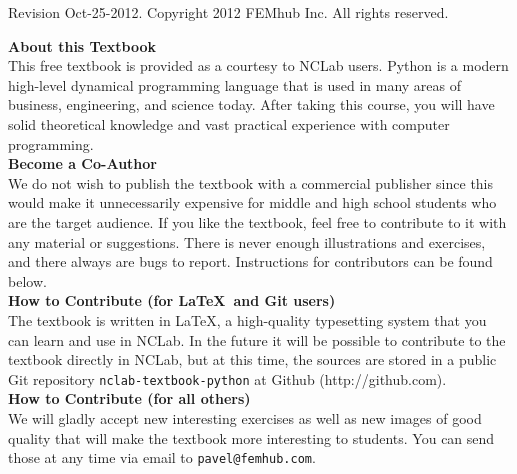 \documentclass[article,A4,12pt]{llncs}
\newif\iffullversion
\begin{document}
\begin{center}
\end{center}
\vbox{}
\vspace{5mm}
\begin{center}
\iffullversion
\else
\centerline{\huge \color{red}{PREVIEW}}
\fi
\vfill
\end{center}
\vfill
\vfill
\begin{center}
Revision Oct-25-2012. Copyright 2012 FEMhub Inc. All rights reserved.
\end{center}
\newpage
\vbox{}
\vfill
{
\noindent
{\bf About this Textbook}\\[4mm]
This free textbook is provided as a courtesy to NCLab users. 
Python is a modern high-level 
dynamical programming language that is used in many areas of business, 
engineering, and science today. After taking this course, you will 
have solid theoretical knowledge and vast practical experience with 
computer programming. \\[4mm]

\noindent
{\bf Become a Co-Author}\\[4mm]
We do not wish to publish the textbook with a commercial publisher since this 
would make it unnecessarily expensive for middle and high school students who
are the target audience. If you like the textbook, feel free to contribute 
to it with any material or suggestions. There is never enough illustrations and exercises, 
and there always are bugs to report. Instructions for contributors can be found 
below.\\[4mm]

\noindent
{\bf How to Contribute (for \LaTeX \ and Git users)}\\[4mm]
\noindent
The textbook is written in \LaTeX, a high-quality typesetting system that 
you can learn and use in NCLab. In the future it will be possible to contribute to 
the textbook directly in NCLab, but at this time, the sources are stored 
in a public Git repository {\tt nclab-textbook-python} at Github (http://github.com). \\[4mm]

\noindent
{\bf How to Contribute (for all others)}\\[4mm]
\noindent
We will gladly accept new interesting exercises as well as
new images of good quality that will make the textbook more interesting to students. You
can send those at any time via email to {\tt pavel@femhub.com}.\\[4mm]

}
\end{document}

